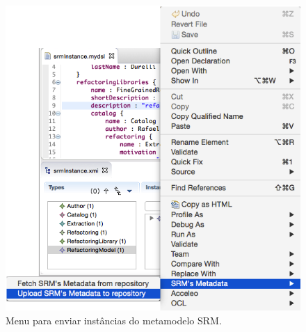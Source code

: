 \begin{figure}[!h]
	\centering
	\caption{Menu para enviar instâncias do metamodelo SRM.}
	\label{fig:editor_SRM_metamodel_ECORE_menu}
	\includegraphics[scale=0.65]{images/SRM_Upload_Image}
	\fautor
\end{figure}



